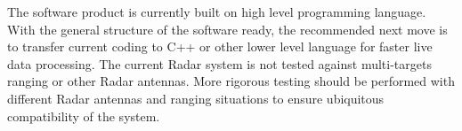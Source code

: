 \documentclass[letterpaper, 12 pt, conference]{report}
\numberwithin{figure}{section}
\begin{document}
The software product is currently built on high level programming language. With the general structure of the software ready, the recommended next move is to transfer current coding to C++ or other lower level language for faster live data processing. The current Radar system is not tested against multi-targets ranging or other Radar antennas. More rigorous testing should be performed with different Radar antennas and ranging situations to ensure ubiquitous compatibility of the system.


\end{document}
